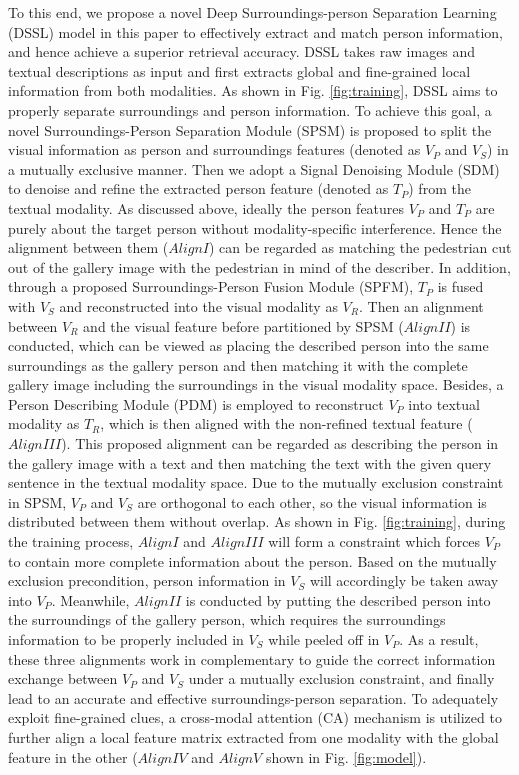 \documentclass[sigconf]{acmart}
\begin{document}
To this end, we propose a novel Deep Surroundings-person Separation Learning (DSSL) model in this paper to effectively extract and match person information, and hence achieve a superior retrieval accuracy. DSSL takes raw images and textual descriptions as input and first extracts global and fine-grained local information from both modalities. As shown in Fig. \ref{fig:training}, DSSL aims to properly separate surroundings and person information. To achieve this goal, a novel Surroundings-Person Separation Module (SPSM) is proposed to split the visual information as person and surroundings features (denoted as $V_{P}$ and $V_{S}$) in a mutually exclusive manner. Then we adopt a Signal Denoising Module (SDM) to denoise and refine the extracted person feature (denoted as $T_{P}$) from the textual modality. As discussed above, ideally the person features $V_{P}$ and $T_{P}$ are purely about the target person without modality-specific interference. Hence the alignment between them ($Align I$) can be regarded as matching the pedestrian cut out of the gallery image with the pedestrian in mind of the describer. In addition, through a proposed Surroundings-Person Fusion Module (SPFM), $T_{P}$ is fused with $V_{S}$ and reconstructed into the visual modality as $V_{R}$. Then an alignment between $V_{R}$ and the visual feature before partitioned by SPSM ($Align II$) is conducted, which can be viewed as placing the described person into the same surroundings as the gallery person and then matching it with the complete gallery image including the surroundings in the visual modality space. Besides, a Person Describing Module (PDM) is employed to reconstruct $V_{P}$ into textual modality as $T_{R}$, which is then aligned with the non-refined textual feature ($Align III$). This proposed alignment can be regarded as describing the person in the gallery image with a text and then matching the text with the given query sentence in the textual modality space. Due to the mutually exclusion constraint in SPSM, $V_{P}$ and $V_{S}$ are orthogonal to each other, so the visual information is distributed between them without overlap. As shown in Fig. \ref{fig:training}, during the training process, $Align I$ and $Align III$ will form a constraint which forces $V_{P}$ to contain more complete information about the person. Based on the mutually exclusion precondition, person information in $V_{S}$ will accordingly be taken away into $V_{P}$. Meanwhile, $Align II$ is conducted by putting the described person into the surroundings of the gallery person, which requires the surroundings information to be properly included in $V_{S}$ while peeled off in $V_{P}$. As a result, these three alignments work in complementary to guide the correct information exchange between $V_{P}$ and $V_{S}$ under a mutually exclusion constraint, and finally lead to an accurate and effective surroundings-person separation. To adequately exploit fine-grained clues, a cross-modal attention (CA) mechanism \cite{niu2020improving, wang2020img} is utilized to further align a local feature matrix extracted from one modality with the global feature in the other ($Align IV$ and $Align V$ shown in Fig. \ref{fig:model}).
\end{document}
